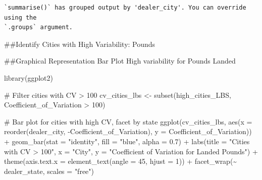 \documentclass[
  letterpaper,
  DIV=11,
  numbers=noendperiod]{scrartcl}
\newenvironment{Shaded}{\begin{snugshade}}{\end{snugshade}}
\newcommand{\AttributeTok}[1]{\textcolor[rgb]{0.40,0.45,0.13}{#1}}
\newcommand{\CommentTok}[1]{\textcolor[rgb]{0.37,0.37,0.37}{#1}}
\newcommand{\ConstantTok}[1]{\textcolor[rgb]{0.56,0.35,0.01}{#1}}
\newcommand{\DecValTok}[1]{\textcolor[rgb]{0.68,0.00,0.00}{#1}}
\newcommand{\FloatTok}[1]{\textcolor[rgb]{0.68,0.00,0.00}{#1}}
\newcommand{\FunctionTok}[1]{\textcolor[rgb]{0.28,0.35,0.67}{#1}}
\newcommand{\NormalTok}[1]{\textcolor[rgb]{0.00,0.23,0.31}{#1}}
\newcommand{\OtherTok}[1]{\textcolor[rgb]{0.00,0.23,0.31}{#1}}
\newcommand{\SpecialCharTok}[1]{\textcolor[rgb]{0.37,0.37,0.37}{#1}}
\newcommand{\StringTok}[1]{\textcolor[rgb]{0.13,0.47,0.30}{#1}}
\begin{document}
\begin{verbatim}
`summarise()` has grouped output by 'dealer_city'. You can override using the
`.groups` argument.
\end{verbatim}

\#\#Identify Cities with High Variability: Pounds

\begin{Shaded}
\end{Shaded}

\#\#Graphical Representation Bar Plot High variability for Pounds Landed

\begin{Shaded}
\begin{Highlighting}[]
\FunctionTok{library}\NormalTok{(ggplot2)}

\CommentTok{\# Filter cities with CV \textgreater{} 100}
\NormalTok{cv\_cities\_lbs }\OtherTok{\textless{}{-}} \FunctionTok{subset}\NormalTok{(high\_cities\_LBS, Coefficient\_of\_Variation }\SpecialCharTok{\textgreater{}} \DecValTok{100}\NormalTok{)}


\CommentTok{\# Bar plot for cities with high CV, facet by state}
\FunctionTok{ggplot}\NormalTok{(cv\_cities\_lbs, }\FunctionTok{aes}\NormalTok{(}\AttributeTok{x =} \FunctionTok{reorder}\NormalTok{(dealer\_city, }\SpecialCharTok{{-}}\NormalTok{Coefficient\_of\_Variation), }\AttributeTok{y =}\NormalTok{ Coefficient\_of\_Variation)) }\SpecialCharTok{+}
  \FunctionTok{geom\_bar}\NormalTok{(}\AttributeTok{stat =} \StringTok{"identity"}\NormalTok{, }\AttributeTok{fill =} \StringTok{"blue"}\NormalTok{, }\AttributeTok{alpha =} \FloatTok{0.7}\NormalTok{) }\SpecialCharTok{+}
  \FunctionTok{labs}\NormalTok{(}\AttributeTok{title =} \StringTok{"Cities with CV \textgreater{} 100"}\NormalTok{, }\AttributeTok{x =} \StringTok{"City"}\NormalTok{, }\AttributeTok{y =} \StringTok{"Coefficient of Variation for Landed Pounds"}\NormalTok{) }\SpecialCharTok{+}
  \FunctionTok{theme}\NormalTok{(}\AttributeTok{axis.text.x =} \FunctionTok{element\_text}\NormalTok{(}\AttributeTok{angle =} \DecValTok{45}\NormalTok{, }\AttributeTok{hjust =} \DecValTok{1}\NormalTok{)) }\SpecialCharTok{+}
  \FunctionTok{facet\_wrap}\NormalTok{(}\SpecialCharTok{\textasciitilde{}}\NormalTok{ dealer\_state, }\AttributeTok{scales =} \StringTok{"free"}\NormalTok{)}
\end{Highlighting}
\end{Shaded}
\end{document}
